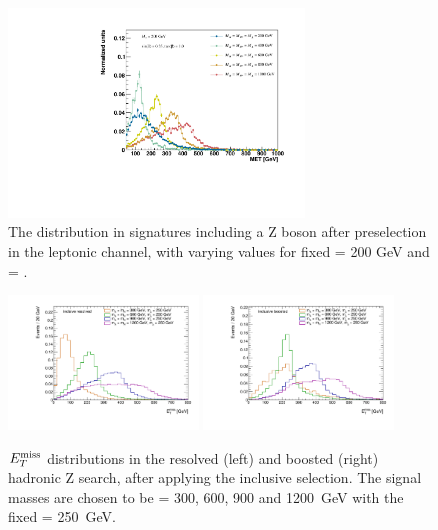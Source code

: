 \begin{figure}%
	\centering

	\centering
	\includegraphics[width=0.7\textwidth]{texinputs/04_grid/figures/monoz/leptonic/mAscan_for_ma200_axis.pdf}	
	\caption{The \MET distribution in signatures including a Z boson after preselection in the leptonic channel, with varying \mA values for fixed \ma = 200 GeV and \mA = \mH. \label{fig:monoz_ll_mA_scan}}

\end{figure}

\begin{figure}
\centering

\includegraphics[width=0.45\textwidth]{texinputs/04_grid/figures/monoz/hadronic/ma250_incl_resl_MET_linear.pdf}
\includegraphics[width=0.45\textwidth]{texinputs/04_grid/figures/monoz/hadronic/ma250_incl_merged_MET_linear.pdf}
\caption{$E_T^\mathrm{miss}$ distributions in the resolved (left) and boosted (right) hadronic Z search, after applying the inclusive selection. 
The signal masses are chosen to be \mA = 300, 600, 900 and 1200~GeV with the fixed \ma = 250~GeV.
\label{fig:monozhad_kin_inc_fixed_ma}}

\end{figure}

